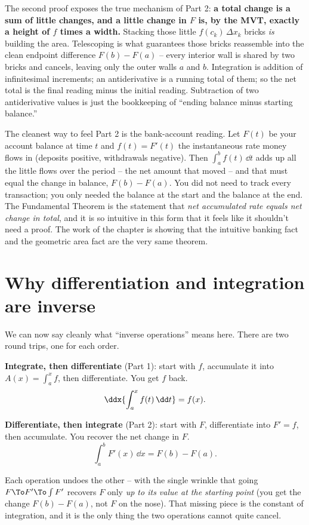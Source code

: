 \begin{whybox}
The second proof exposes the true mechanism of Part 2: \textbf{a total change is
a sum of little changes, and a little change in $F$ is, by the MVT, exactly a
height of $f$ times a width.} Stacking those little $f(c_k)\,\Delta x_k$ bricks
\emph{is} building the area. Telescoping is what guarantees those bricks reassemble
into the clean endpoint difference $F(b)-F(a)$ -- every interior wall is shared by
two bricks and cancels, leaving only the outer walls $a$ and $b$. Integration is
addition of infinitesimal increments; an antiderivative is a running total of
them; so the net total is the final reading minus the initial reading. Subtraction
of two antiderivative values is just the bookkeeping of ``ending balance minus
starting balance.''
\end{whybox}

\begin{happeningbox}
The cleanest way to feel Part 2 is the bank-account reading. Let $F(t)$ be your
account balance at time $t$ and $f(t)=F'(t)$ the instantaneous rate money flows
in (deposits positive, withdrawals negative). Then $\int_a^b f(t)\,\dd t$ adds up
all the little flows over the period -- the net amount that moved -- and that must
equal the change in balance, $F(b)-F(a)$. You did not need to track every
transaction; you only needed the balance at the start and the balance at the end.
The Fundamental Theorem is the statement that \emph{net accumulated rate equals
net change in total}, and it is so intuitive in this form that it feels like it
shouldn't need a proof. The work of the chapter is showing that the intuitive
banking fact and the geometric area fact are the very same theorem.
\end{happeningbox}

\section{Why differentiation and integration are inverse}

We can now say cleanly what ``inverse operations'' means here. There are two
round trips, one for each order.

\begin{focusbox}
\textbf{Integrate, then differentiate} (Part 1): start with $f$, accumulate it
into $A(x)=\int_a^x f$, then differentiate. You get $f$ back.
\[
  \ddx{\int_a^x f(t)\,\dd t} = f(x).
\]

\textbf{Differentiate, then integrate} (Part 2): start with $F$, differentiate
into $F'=f$, then accumulate. You recover the net change in $F$.
\[
  \int_a^b F'(x)\,\dd x = F(b)-F(a).
\]

Each operation undoes the other -- with the single wrinkle that going
$F\To F'\To \int F'$ recovers $F$ only \emph{up to its value at the starting
point} (you get the change $F(b)-F(a)$, not $F$ on the nose). That missing piece
is the constant of integration, and it is the only thing the two operations
cannot quite cancel.
\end{focusbox}


